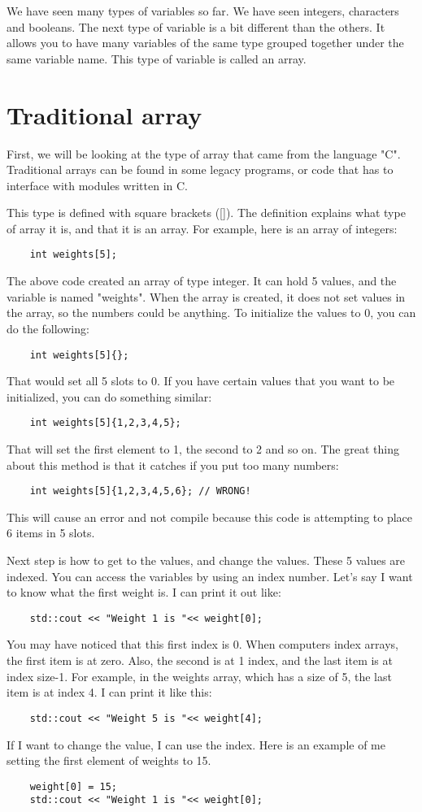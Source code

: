 We have seen many types of variables so far. We have seen integers, characters and booleans. The next type of variable
is a bit different than the others. It allows you to have
many variables of the same type grouped together under the
same variable name. This type of variable is called an array.
\section{Traditional array}
First, we will be looking at the type of array that came from
the language "C". Traditional arrays can be found in some legacy programs, or code that has to interface with modules written in C.

This type is defined with square brackets ([]). The definition explains what type of array it is, and that it
is an array. For example, here is an array of integers:

\begin{verbatim}
    int weights[5];
\end{verbatim}
The above code created an array of type integer. It can hold
5 values, and the variable is named "weights". When the array is created, it does not set values in the array, so the numbers could be anything. To initialize the values to 0, 
you can do the following:
\begin{verbatim}
    int weights[5]{};
\end{verbatim}
That would set all 5 slots to 0. If you have certain values that you want to be initialized,
you can do something similar:
\begin{verbatim}
    int weights[5]{1,2,3,4,5};
\end{verbatim}
That will set the first element to 1, the second to 2 and so on. The great thing about this method is that it catches if you
put too many numbers:
\begin{verbatim}
    int weights[5]{1,2,3,4,5,6}; // WRONG!
\end{verbatim}
This will cause an error and not compile because this code
is attempting to place 6 items in 5 slots.

Next step is how to get to the values, and change the values.
These 5 values are indexed. You can access the variables by
using an index number. Let's say I want to know what the first weight is. I can print it out like:

\begin{verbatim}
    std::cout << "Weight 1 is "<< weight[0];
\end{verbatim}
You may have noticed that this first index is 0. When computers index arrays, the first item is at zero. Also,
the second is at 1 index, and the last item is at index
size-1. For example, in the weights array, which has a size
of 5, the last item is at index 4. I can print it like this:
\begin{verbatim}
    std::cout << "Weight 5 is "<< weight[4];
\end{verbatim}
If I want to change the value, I can use the index. Here
is an example of me setting the first element of weights
to 15.
\begin{verbatim}
    weight[0] = 15;
    std::cout << "Weight 1 is "<< weight[0];
\end{verbatim}

